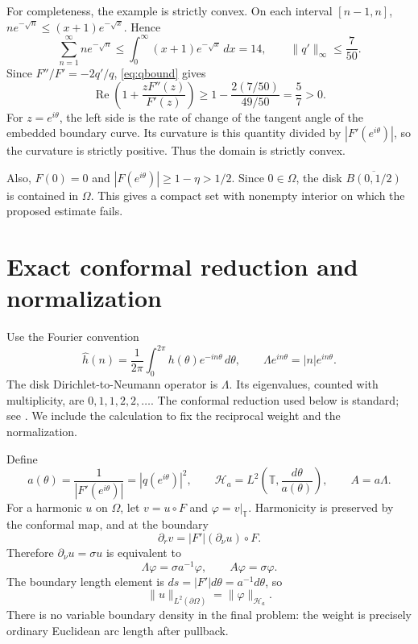 \documentclass[11pt]{article}
\theoremstyle{remark}
\newcommand{\T}{\mathbb T}
\newcommand{\Hh}{\mathcal H}
\DeclareMathOperator{\Rea}{Re}
\begin{document}
For completeness, the example is strictly convex. On each interval $[n-1,n]$,
$n e^{-\sqrt n}\leq (x+1)e^{-\sqrt x}$. Hence
\[
 \sum_{n=1}^\infty n e^{-\sqrt n}
 \leq\int_0^\infty(x+1)e^{-\sqrt x}\,dx=14,
 \qquad \|q'\|_\infty\leq\frac7{50}.
\]
Since $F''/F'=-2q'/q$, \eqref{eq:qbound} gives
\begin{equation}\label{eq:convex}
 \Rea\left(1+\frac{zF''(z)}{F'(z)}\right)
 \geq 1-\frac{2(7/50)}{49/50}=\frac57>0.
\end{equation}
For $z=e^{i\theta}$, the left side is the rate of change of the tangent angle of the embedded boundary curve. Its curvature is this quantity divided by $|F'(e^{i\theta})|$, so the curvature is strictly positive. Thus the domain is strictly convex.

Also, $F(0)=0$ and $|F(e^{i\theta})|\geq1-\eta>1/2$. Since $0\in\Omega$, the disk $\overline{B(0,1/2)}$ is contained in $\Omega$. This gives a compact set with nonempty interior on which the proposed estimate fails.

\section{Exact conformal reduction and normalization}
Use the Fourier convention
\[
 \widehat h(n)=\frac1{2\pi}\int_0^{2\pi}h(\theta)e^{-in\theta}\,d\theta,
 \qquad \Lambda e^{in\theta}=|n|e^{in\theta}.
\]
The disk Dirichlet-to-Neumann operator is $\Lambda$. Its eigenvalues, counted with multiplicity, are $0,1,1,2,2,\ldots$. The conformal reduction used below is standard; see \cite{MS}. We include the calculation to fix the reciprocal weight and the normalization.

Define
\begin{equation}\label{eq:a}
 a(\theta)=\frac1{|F'(e^{i\theta})|}=|q(e^{i\theta})|^2,
 \qquad
 \Hh_a=L^2\left(\T,\frac{d\theta}{a(\theta)}\right),
 \qquad A=a\Lambda.
\end{equation}
For a harmonic $u$ on $\Omega$, let $v=u\circ F$ and $\varphi=v|_{\T}$. Harmonicity is preserved by the conformal map, and at the boundary
\[
 \partial_r v=|F'|(\partial_\nu u)\circ F.
\]
Therefore $\partial_\nu u=\sigma u$ is equivalent to
\[
 \Lambda\varphi=\sigma a^{-1}\varphi,
 \qquad A\varphi=\sigma\varphi.
\]
The boundary length element is $ds=|F'|d\theta=a^{-1}d\theta$, so
\begin{equation}\label{eq:norm}
 \|u\|_{L^2(\partial\Omega)}=\|\varphi\|_{\Hh_a}.
\end{equation}
There is no variable boundary density in the final problem: the weight is precisely ordinary Euclidean arc length after pullback.
\end{document}

